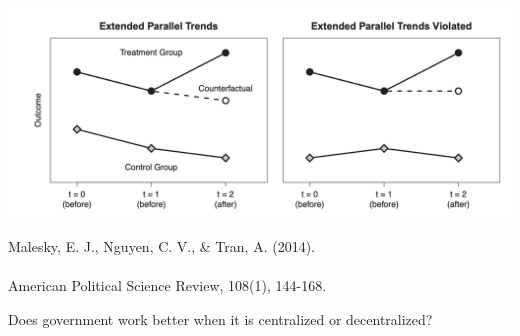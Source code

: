 \documentclass{beamer}
\newcommand\bref[2]{\href{#1}{\color{blue}{#2}}}
\begin{document}

\begin{frame}
\includegraphics[width = \textwidth]{figures/ey_ept}
\end{frame}

\begin{frame}

Malesky, E. J., Nguyen, C. V., \& Tran, A. (2014).\\
\bref{https://doi.org/10.1017/S0003055413000580}{The impact of recentralization on public services:\\A difference-in-differences analysis of the abolition of elected councils in Vietnam.}\\
American Political Science Review, 108(1), 144-168.

\end{frame}

\begin{frame}

Does government work better when it is centralized or decentralized?

\end{frame}
\end{document}
